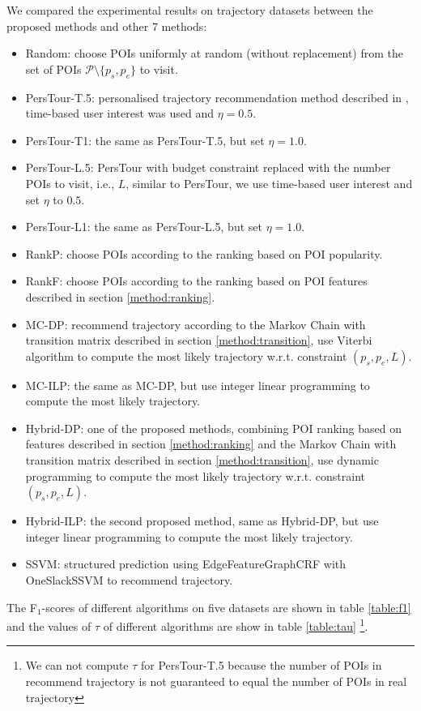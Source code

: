 We compared the experimental results on trajectory datasets between the proposed methods and other 7 methods:
\begin{itemize}
\item Random: choose POIs uniformly at random (without replacement) from the set of POIs $\mathcal{P} \setminus \{p_s, p_e \}$ to visit.
\item PersTour-T.5\cite{ijcai15}: personalised trajectory recommendation method described in \cite{ijcai15}, 
      time-based user interest was used and $\eta = 0.5$.
\item PersTour-T1\cite{ijcai15}: the same as PersTour-T.5, but set $\eta=1.0$.
\item PersTour-L.5: PersTour\cite{ijcai15} with budget constraint replaced with the number POIs to visit, i.e., $L$,
      similar to PersTour, we use time-based user interest and set $\eta$ to $0.5$.
\item PersTour-L1: the same as PersTour-L.5, but set $\eta=1.0$.
\item RankP: choose POIs according to the ranking based on POI popularity.
\item RankF: choose POIs according to the ranking based on POI features described in section \ref{method:ranking}.
\item MC-DP: recommend trajectory according to the Markov Chain with transition matrix described in section \ref{method:transition},
      use Viterbi algorithm to compute the most likely trajectory w.r.t. constraint $(p_s, p_e, L)$.
\item MC-ILP: the same as MC-DP, but use integer linear programming to compute the most likely trajectory.
\item Hybrid-DP: one of the proposed methods, combining POI ranking based on features 
      described in section \ref{method:ranking} and the Markov Chain with transition matrix described in section \ref{method:transition},
      use dynamic programming to compute the most likely trajectory w.r.t. constraint $(p_s, p_e, L)$.
\item Hybrid-ILP: the second proposed method, same as Hybrid-DP,
      but use integer linear programming to compute the most likely trajectory.
\item SSVM: structured prediction using EdgeFeatureGraphCRF with OneSlackSSVM to recommend trajectory.
\end{itemize}

The F$_1$-scores of different algorithms on five datasets are shown in table \ref{table:f1}
and the values of $\tau$ of different algorithms are show in table \ref{table:tau}
\footnote{We can not compute $\tau$ for PersTour-T.5 because the number of POIs in recommend trajectory is not guaranteed to equal the number of POIs in real trajectory}.

